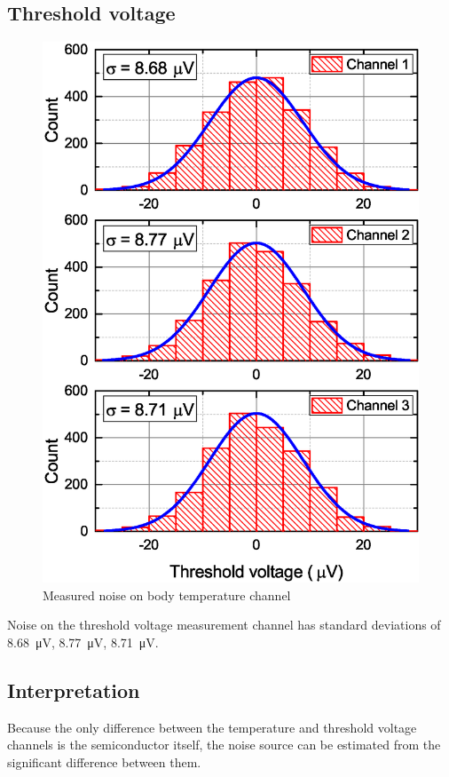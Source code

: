     \subsection{Threshold voltage}
        \begin{figure}[H]
            \centering
            \includegraphics[width=0.6\paperwidth]{img/07/thresholdVoltageHistograms.eps}
            \caption{Measured noise on body temperature channel}
        \end{figure}

        Noise on the threshold voltage measurement channel has standard deviations of \SI{8.68}{\uV}, \SI{8.77}{\uV}, \SI{8.71}{\uV}.



    \subsection{Interpretation}
        Because the only difference between the temperature and threshold voltage channels is the semiconductor itself, the noise source can be estimated from the significant difference between them.

